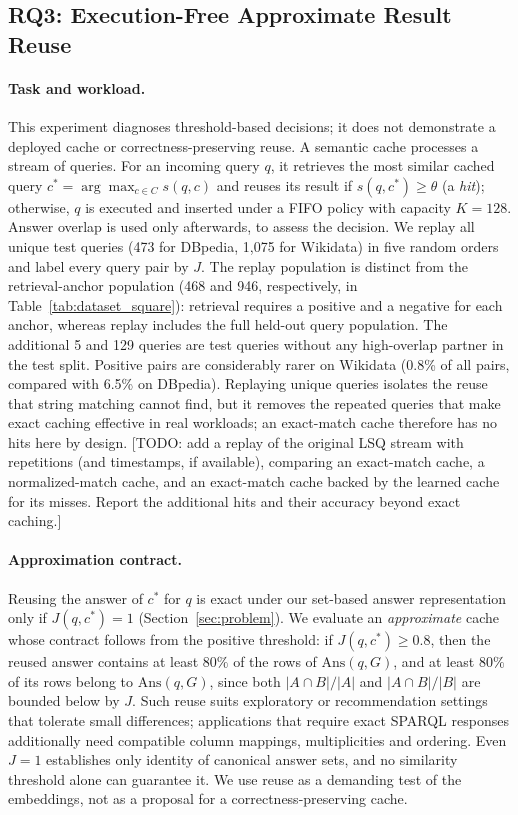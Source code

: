 \documentclass[runningheads]{llncs}
\newcommand{\Ans}{\mathrm{Ans}}
\newcommand{\hp}[1]{{\color{red!75!black}#1}}
\begin{document}
\subsection{RQ3: Execution-Free Approximate Result Reuse}
\label{sec:caching}

\paragraph{Task and workload.}
This experiment diagnoses threshold-based decisions; it does not demonstrate
a deployed cache or correctness-preserving reuse. A semantic cache processes a stream of queries. For an incoming query $q$, it
retrieves the most similar cached query $c^* = \arg\max_{c \in C} s(q,c)$ and
reuses its result if $s(q,c^*) \geq \theta$ (a \emph{hit}); otherwise, $q$ is
executed and inserted under a FIFO policy with capacity $K = 128$. Answer
overlap is used only afterwards, to assess the decision. We replay all unique
test queries (473 for DBpedia, 1{,}075 for Wikidata) in five random orders and
label every query pair by $J$. The replay population is distinct from the
retrieval-anchor population (468 and 946, respectively, in
Table~\ref{tab:dataset_square}): retrieval requires a positive and a negative
for each anchor, whereas replay includes the full held-out query population.
The additional 5 and 129 queries are test queries without any high-overlap
partner in the test split. Positive pairs are considerably rarer on
Wikidata (0.8\% of all pairs, compared with 6.5\% on DBpedia). Replaying unique
queries isolates the reuse that string matching cannot find, but it removes
the repeated queries that make exact caching effective in real workloads; an
exact-match cache therefore has no hits here by design.
\hp{[TODO: add a replay of the original LSQ stream with repetitions (and
timestamps, if available), comparing an exact-match cache, a normalized-match
cache, and an exact-match cache backed by the learned cache for its misses.
Report the additional hits and their accuracy beyond exact caching.]}

\paragraph{Approximation contract.}
Reusing the answer of $c^*$ for $q$ is exact under our set-based answer
representation only if $J(q,c^*) = 1$ (Section~\ref{sec:problem}). We
evaluate an \emph{approximate} cache whose contract follows from the
positive threshold: if $J(q,c^*) \geq 0.8$, then the reused answer contains at
least $80\%$ of the rows of $\Ans(q,G)$, and at least $80\%$ of its rows belong
to $\Ans(q,G)$, since both $|A \cap B|/|A|$ and $|A \cap B|/|B|$ are bounded
below by $J$. Such reuse suits exploratory or recommendation settings that
tolerate small differences; applications that require exact SPARQL responses additionally need compatible
column mappings, multiplicities and ordering. Even $J = 1$ establishes only
identity of canonical answer sets, and no similarity threshold alone can
guarantee it. We
use reuse as a demanding test of the embeddings, not as a proposal for a
correctness-preserving cache.
\end{document}
